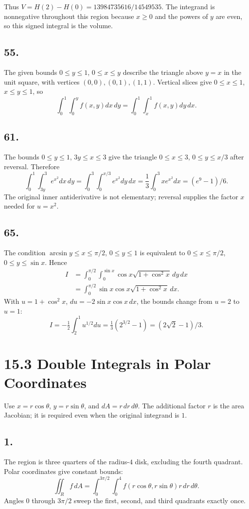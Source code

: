 \documentclass[11pt]{article}
\newcommand{\ex}[1]{\subsection*{#1.}}
\newcommand{\ans}[1]{\boxed{#1}}
\begin{document}
Thus $\ans{V=H(2)-H(0)=13984735616/14549535}$. The integrand is nonnegative throughout this region because $x\ge0$ and the powers of $y$ are even, so this signed integral is the volume.
\ex{55}
The given bounds $0\le y\le1$, $0\le x\le y$ describe the triangle above $y=x$ in the unit square, with vertices $(0,0),(0,1),(1,1)$. Vertical slices give $0\le x\le1$, $x\le y\le1$, so
\[\ans{\int_0^1\int_0^yf(x,y)dx\,dy=\int_0^1\int_x^1f(x,y)dy\,dx}.\]
\begin{center}\end{center}
\ex{61}
The bounds $0\le y\le1$, $3y\le x\le3$ give the triangle $0\le x\le3$, $0\le y\le x/3$ after reversal. Therefore
\[\int_0^1\int_{3y}^3e^{x^2}dx\,dy=\int_0^3\int_0^{x/3}e^{x^2}dy\,dx
=\frac13\int_0^3xe^{x^2}dx=\ans{(e^9-1)/6}.\]
The original inner antiderivative is not elementary; reversal supplies the factor $x$ needed for $u=x^2$.
\ex{65}
The condition $\arcsin y\le x\le\pi/2$, $0\le y\le1$ is equivalent to $0\le x\le\pi/2$, $0\le y\le\sin x$. Hence
\begin{align*}
I&=\int_0^{\pi/2}\int_0^{\sin x}\cos x\sqrt{1+\cos^2x}\,dy\,dx\\
&=\int_0^{\pi/2}\sin x\cos x\sqrt{1+\cos^2x}\,dx.
\end{align*}
With $u=1+\cos^2x$, $du=-2\sin x\cos x\,dx$, the bounds change from $u=2$ to $u=1$:
\[I=-\tfrac12\int_2^1u^{1/2}du=\tfrac13(2^{3/2}-1)=\ans{(2\sqrt2-1)/3}.\]
\clearpage\section*{15.3 Double Integrals in Polar Coordinates}
\noindent Use $x=r\cos\theta$, $y=r\sin\theta$, and $dA=r\,dr\,d\theta$. The additional factor $r$ is the area Jacobian; it is required even when the original integrand is $1$.
\ex{1}
The region is three quarters of the radius-$4$ disk, excluding the fourth quadrant. Polar coordinates give constant bounds:
\[\ans{\iint_R f\,dA=\int_0^{3\pi/2}\int_0^4 f(r\cos\theta,r\sin\theta)r\,dr\,d\theta}.\]
Angles $0$ through $3\pi/2$ sweep the first, second, and third quadrants exactly once.
\end{document}

